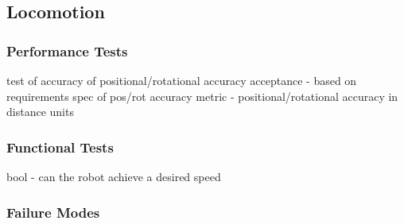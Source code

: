 
\subsection{Locomotion}
\label{sec:verification_locomotion}

\subsubsection{Performance Tests}
\label{sec:locomotion_pt}

test of accuracy of positional/rotational accuracy
acceptance - based on requirements spec of pos/rot accuracy
metric - positional/rotational accuracy in distance units

\subsubsection{Functional Tests}
\label{sec:locomotion_ft}

bool - can the robot achieve a desired speed


\subsubsection{Failure Modes}
\label{sec:locomotion_fm}
